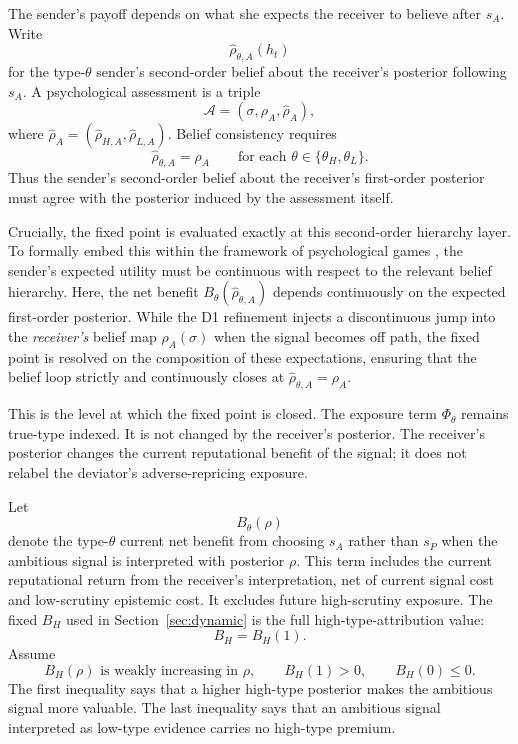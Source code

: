 The sender's payoff depends on what she expects the receiver to believe after \(s_A\). Write
\[
\widehat \rho_{\theta,A}(h_t)
\]
for the type-\(\theta\) sender's second-order belief about the receiver's posterior following \(s_A\). A psychological assessment is a triple
\[
\mathcal A=(\sigma,\rho_A,\widehat \rho_A),
\]
where \(\widehat \rho_A=(\widehat\rho_{H,A},\widehat\rho_{L,A})\). Belief consistency requires
\[
\widehat\rho_{\theta,A}=\rho_A
\qquad\text{for each }\theta\in\{\theta_H,\theta_L\}.
\]
Thus the sender's second-order belief about the receiver's first-order posterior must agree with the posterior induced by the assessment itself.

Crucially, the fixed point is evaluated exactly at this second-order hierarchy layer. To formally embed this within the framework of psychological games \citep{battigalli2009dynamic}, the sender's expected utility must be continuous with respect to the relevant belief hierarchy. Here, the net benefit $B_\theta(\widehat{\rho}_{\theta,A})$ depends continuously on the expected first-order posterior. While the D1 refinement injects a discontinuous jump into the \emph{receiver's} belief map $\rho_A(\sigma)$ when the signal becomes off path, the fixed point is resolved on the composition of these expectations, ensuring that the belief loop strictly and continuously closes at $\widehat\rho_{\theta,A} = \rho_A$.

This is the level at which the fixed point is closed. The exposure term \(\Phi_\theta\) remains true-type indexed. It is not changed by the receiver's posterior. The receiver's posterior changes the current reputational benefit of the signal; it does not relabel the deviator's adverse-repricing exposure.

Let
\[
B_\theta(\rho)
\]
denote the type-\(\theta\) current net benefit from choosing \(s_A\) rather than \(s_P\) when the ambitious signal is interpreted with posterior \(\rho\). This term includes the current reputational return from the receiver's interpretation, net of current signal cost and low-scrutiny epistemic cost. It excludes future high-scrutiny exposure. The fixed \(B_H\) used in Section~\ref{sec:dynamic} is the full high-type-attribution value:
\[
B_H=B_H(1).
\]
Assume
\[
B_H(\rho)\text{ is weakly increasing in }\rho,
\qquad
B_H(1)>0,
\qquad
B_H(0)\le 0.
\]
The first inequality says that a higher high-type posterior makes the ambitious signal more valuable. The last inequality says that an ambitious signal interpreted as low-type evidence carries no high-type premium.

